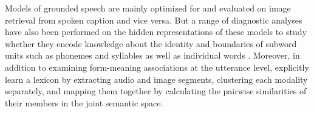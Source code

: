 Models of grounded speech are mainly optimized for and evaluated on
image retrieval from spoken caption and vice versa. But a range of
diagnostic analyses have also been performed on the hidden
representations of these models to study whether they encode knowledge
about the identity and boundaries of subword units such as phonemes
and syllables \cite{alishahi-etal-2017-encoding, harwath2019towards,
  khorrami_2021} as well as individual words
\cite{chrupala-etal-2017-representations,havard2019word}. Moreover, in
addition to examining form-meaning associations at the utterance
level, \cite{harwath2017learning} explicitly learn a lexicon by
extracting audio and image segments, clustering each modality
separately, and mapping them together by calculating the pairwise
similarities of their members in the joint semantic space.


